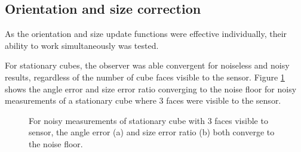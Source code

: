 \subsection{Orientation and size correction} 
As the orientation and size update functions were effective individually, their ability to work simultaneously was tested.

For stationary cubes, the observer was able convergent for noiseless and noisy results, regardless of the number of cube faces visible to the sensor. Figure \ref{fig:orientation_size_stationary} shows the angle error and size error ratio converging to the noise floor for noisy measurements of a stationary cube where 3 faces were visible to the sensor.

\begin{figure}
\centering
 	\caption{For noisy measurements of stationary cube with 3 faces visible to sensor, the angle error (a) and size error ratio (b) both converge to the noise floor.}
 	\label{fig:orientation_size_stationary}
\end{figure} 	

